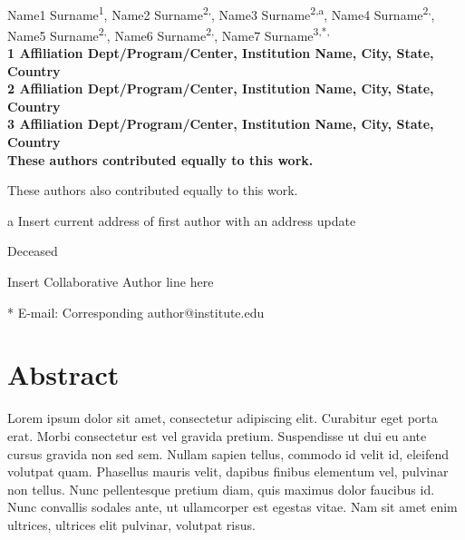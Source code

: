 
\vspace*{0.35in}

\begin{flushleft}
{\Large
\textbf{}
}
\newline
\\
Name1 Surname\textsuperscript{1},
Name2 Surname\textsuperscript{2,\textpilcrow},
Name3 Surname\textsuperscript{2,\textcurrency a},
Name4 Surname\textsuperscript{2,\ddag},
Name5 Surname\textsuperscript{2,\ddag},
Name6 Surname\textsuperscript{2,\Yinyang},
Name7 Surname\textsuperscript{3,*,\Yinyang}
\\
\bf{1} Affiliation Dept/Program/Center, Institution Name, City, State, Country
\\
\bf{2} Affiliation Dept/Program/Center, Institution Name, City, State, Country
\\
\bf{3} Affiliation Dept/Program/Center, Institution Name, City, State, Country
\\

% 
%
\Yinyang These authors contributed equally to this work.

\ddag These authors also contributed equally to this work.

\textcurrency a Insert current address of first author with an address update

\dag Deceased

\textpilcrow Insert Collaborative Author line here

* E-mail: Corresponding author@institute.edu
\end{flushleft}
\section*{Abstract}
Lorem ipsum dolor sit amet, consectetur adipiscing elit. Curabitur eget porta erat. Morbi consectetur est vel gravida pretium. Suspendisse ut dui eu ante cursus gravida non sed sem. Nullam sapien tellus, commodo id velit id, eleifend volutpat quam. Phasellus mauris velit, dapibus finibus elementum vel, pulvinar non tellus. Nunc pellentesque pretium diam, quis maximus dolor faucibus id. Nunc convallis sodales ante, ut ullamcorper est egestas vitae. Nam sit amet enim ultrices, ultrices elit pulvinar, volutpat risus.


